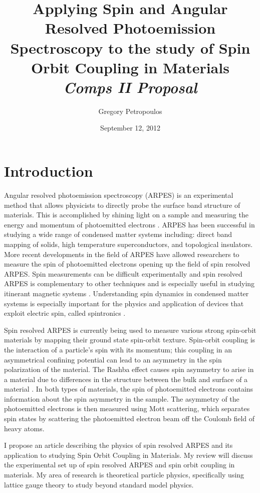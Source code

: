 \documentclass[12pt]{article}
\begin{document}
\title{Applying Spin and Angular Resolved Photoemission Spectroscopy to the study of Spin Orbit Coupling in Materials
\\ \Large{\emph{Comps II Proposal}}}
\author{Gregory Petropoulos}
\date{September 12, 2012}
\maketitle

\section{Introduction}
Angular resolved photoemission spectroscopy (ARPES) is an experimental method that allows physicists to directly probe the surface band structure of materials.
This is accomplished by shining light on a sample and measuring the energy and momentum of photoemitted electrons \cite{Damascelli}.
ARPES has been successful in studying a wide range of condensed matter systems including:  direct band mapping of solids,  high temperature superconductors, and topological insulators.
More recent developments in the field of ARPES have allowed researchers to measure the spin of photoemitted electrons \cite{Dil, Osterwalder} opening up the field of spin resolved ARPES.
Spin measurements can be difficult experimentally and spin resolved ARPES is complementary to other techniques and is especially useful in studying itinerant magnetic systems \cite{Osterwalder}.
Understanding spin dynamics in condensed matter systems is especially important for the physics and application of devices that exploit electric spin, called spintronics \cite{wolf}.

Spin resolved ARPES is currently being used to measure various strong spin-orbit materials by mapping their ground state spin-orbit texture.  Spin-orbit coupling is the interaction of a particle's spin with its momentum; this coupling in an asymmetrical confining potential can lead to an asymmetry in the spin polarization of the material.  The Rashba effect causes spin asymmetry to arise in a material due to differences in the structure between the bulk and surface of a material \cite{Dil}.  In both types of materials, the spin of photoemitted electrons contains information about the spin asymmetry in the sample.  The asymmetry of the photoemitted electrons is then measured using Mott scattering, which separates spin states by scattering the photoemitted electron beam off the Coulomb field of heavy atoms.

I propose an article describing the physics of spin resolved ARPES and its application to studying Spin Orbit Coupling in Materials.  My review will discuss the experimental set up of spin resolved ARPES and \lowercase{spin orbit coupling in materials}.  My area of research is theoretical particle physics, specifically using lattice gauge theory to study beyond standard model physics.
\end{document}
